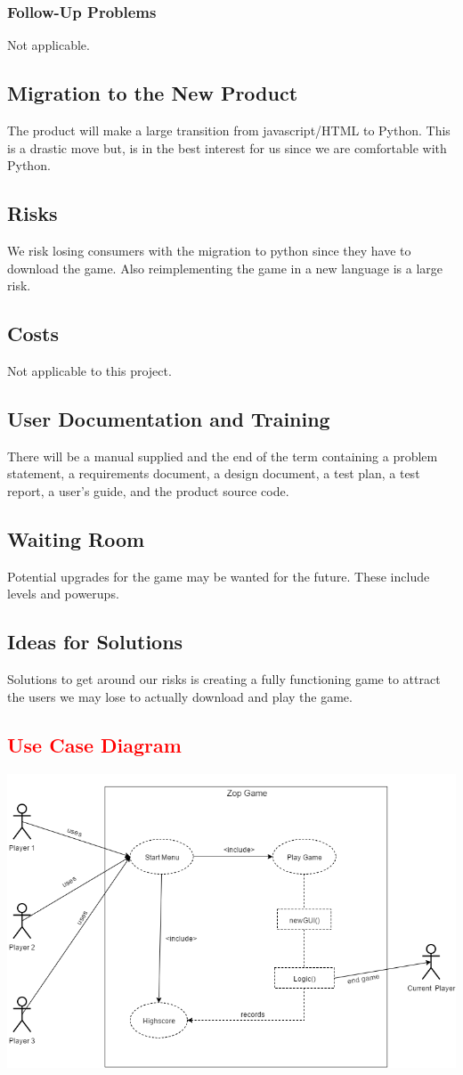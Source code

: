 \documentclass[12pt]{article}
\begin{document}
\subsubsection{Follow-Up Problems}
Not applicable.

\subsection{Migration to the New Product}
The product will make a large transition from javascript/HTML to Python.  This is a drastic move but, is in the best interest for us since we are comfortable with Python.
\subsection{Risks}
We risk losing consumers with the migration to python since they have to download the game. Also reimplementing the game in a new language is a large risk.
\subsection{Costs}
Not applicable to this project.
\subsection{User Documentation and Training}
There will be a manual supplied and the end of the term containing a problem statement, a requirements document, a design document, a test plan, a test
report, a user's guide, and the product source code.
\subsection{Waiting Room}
Potential upgrades for the game may be wanted for the future.  These include levels and powerups.
\subsection{Ideas for Solutions}
Solutions to get around our risks is creating a fully functioning game to attract the users we may lose to actually download and play the game.
\newpage
\textcolor{red}{\section{Use Case Diagram}}
\includegraphics[scale=0.65]{usecase}
\end{document}
